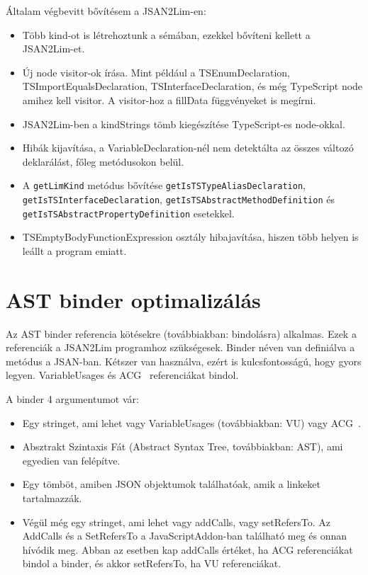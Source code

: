 Általam végbevitt bővítésem a JSAN2Lim-en:
\begin{itemize}
      \item Több kind-ot is létrehoztunk a sémában, ezekkel bővíteni kellett a JSAN2Lim-et.
      \item Új node visitor-ok írása. Mint például a TSEnumDeclaration, TSImportEqualsDeclaration, TSInterfaceDeclaration, és még TypeScript node amihez kell visitor.
      A visitor-hoz a fillData függvényeket is megírni.
      \item JSAN2Lim-ben a kindStrings tömb kiegészítése TypeScript-es node-okkal.
      \item Hibák kijavítása, a VariableDeclaration-nél nem detektálta az összes változó deklarálást, főleg metódusokon belül.
      \item A \texttt{getLimKind} metódus bővítése \texttt{getIsTSTypeAliasDeclaration}, \texttt{getIsTSInterfaceDeclaration},
      \texttt{getIsTSAbstractMethodDefinition} és \texttt{getIsTSAbstractPropertyDefinition} esetekkel.
      \item TSEmptyBodyFunctionExpression osztály hibajavítása, hiszen több helyen is leállt a program emiatt.
\end{itemize}

\section{AST binder optimalizálás}
Az AST binder referencia kötésekre (továbbiakban: bindolásra) alkalmas. Ezek a referenciák a JSAN2Lim programhoz szükségesek.
Binder néven van definiálva a metódus a JSAN-ban.
Kétszer van használva, ezért is kulcsfontosságú, hogy gyors legyen.
VariableUsages és ACG~\cite{feldthaus2013efficient} referenciákat bindol.


A binder 4 argumentumot vár:

\begin{itemize}
      \item Egy stringet, ami lehet vagy VariableUsages (továbbiakban: VU) vagy ACG~\cite{feldthaus2013efficient}.
      \item Absztrakt Szintaxis Fát (Abstract Syntax Tree, továbbiakban: AST), ami egyedien van felépítve.
      \item Egy tömböt, amiben JSON objektumok találhatóak, amik a linkeket tartalmazzák.
      \item Végül még egy stringet, ami lehet vagy addCalls, vagy setRefersTo. Az AddCalls és a SetRefersTo a JavaScriptAddon-ban található meg és onnan hívódik meg.
      Abban az esetben kap addCalls értéket, ha ACG  referenciákat bindol a binder, és akkor setRefersTo, ha VU referenciákat.
\end{itemize}

